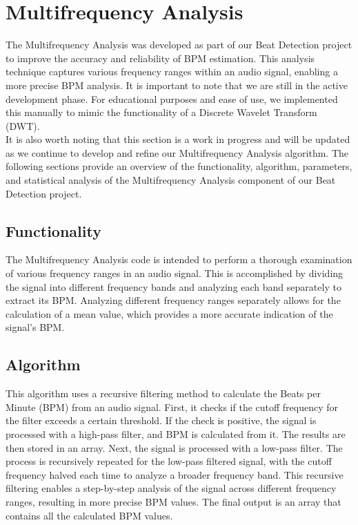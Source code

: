 \section{Multifrequency Analysis}
The Multifrequency Analysis was developed as part of our Beat Detection project to improve the accuracy and reliability of BPM estimation. This analysis technique captures various frequency ranges within an audio signal, enabling a more precise BPM analysis. It is important to note that we are still in the active development phase. For educational purposes and ease of use, we implemented this manually to mimic the functionality of a Discrete Wavelet Transform (DWT). \\

It is also worth noting that this section is a work in progress and will be updated as we continue to develop and refine our Multifrequency Analysis algorithm. The following sections provide an overview of the functionality, algorithm, parameters, and statistical analysis of the Multifrequency Analysis component of our Beat Detection project.

\subsection{Functionality}
The Multifrequency Analysis code is intended to perform a thorough examination of various frequency ranges in an audio signal. This is accomplished by dividing the signal into different frequency bands and analyzing each band separately to extract its BPM. Analyzing different frequency ranges separately allows for the calculation of a mean value, which provides a more accurate indication of the signal's BPM.

\subsection{Algorithm}
This algorithm uses a recursive filtering method to calculate the Beats per Minute (BPM) from an audio signal. First, it checks if the cutoff frequency for the filter exceeds a certain threshold. If the check is positive, the signal is processed with a high-pass filter, and BPM is calculated from it. The results are then stored in an array. Next, the signal is processed with a low-pass filter. The process is recursively repeated for the low-pass filtered signal, with the cutoff frequency halved each time to analyze a broader frequency band. This recursive filtering enables a step-by-step analysis of the signal across different frequency ranges, resulting in more precise BPM values. The final output is an array that contains all the calculated BPM values.

